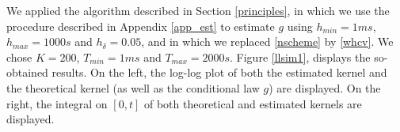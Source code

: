 \documentclass[a4paper,11pt]{article}
\begin{document}
\noindent We applied the algorithm described in Section \ref{principles}, in which
we use the procedure described in Appendix \ref{app_est} to estimate $g$ using $h_{min}=1ms$, $h_{max}=1000s$ and $h_\delta=0.05$, and in which we replaced \eqref{nscheme} by \eqref{whcv}. We chose $K=200$, $T_{min}=1ms$ and $T_{max}=2000s$.
 Figure \ref{llsim1}, displays the so-obtained results. On the left, the log-log plot of both the estimated kernel and the theoretical kernel (as well as the conditional law $g$) are displayed. On the right, the integral on $[0,t]$ of both theoretical and estimated kernels are displayed.

%
\end{document}
